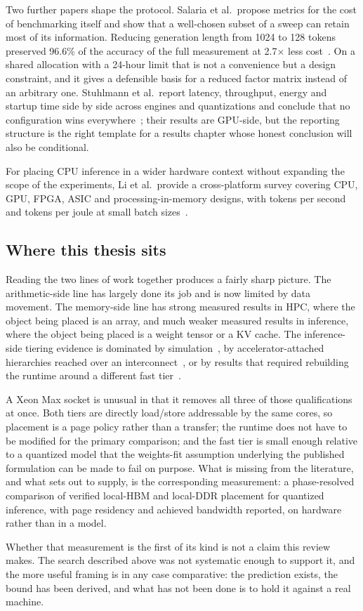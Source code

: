 Two further papers shape the protocol.  Salaria et al.\ propose metrics
for the cost of benchmarking itself and show that a well-chosen subset
of a sweep can retain most of its information.  Reducing generation
length from 1024 to 128 tokens preserved 96.6\% of the accuracy of the
full measurement at 2.7$\times$ less cost~\cite{salaria2025metametrics}.
On a shared allocation with a 24-hour limit that is not a convenience
but a design constraint, and it gives a defensible basis for a reduced
factor matrix instead of an arbitrary one.  Stuhlmann et al.\ report
latency, throughput, energy and startup time side by side across
engines and quantizations and conclude that no configuration wins
everywhere~\cite{stuhlmann2025bench360}; their results are GPU-side, but
the reporting structure is the right template for a results chapter
whose honest conclusion will also be conditional.

For placing CPU inference in a wider hardware context without expanding
the scope of the experiments, Li et al.\ provide a cross-platform survey
covering CPU, GPU, FPGA, ASIC and processing-in-memory designs, with
tokens per second and tokens per joule at small batch
sizes~\cite{li2024hardwareperspective}.

\subsection{Where this thesis sits}
\label{sec:lit-position}

Reading the two lines of work together produces a fairly sharp picture.
The arithmetic-side line has largely done its job and is now limited by
data movement.  The memory-side line has strong measured results in HPC,
where the object being placed is an array, and much weaker measured
results in inference, where the object being placed is a weight tensor
or a KV cache.  The inference-side tiering evidence is dominated by
simulation~\cite{fang2025kvplacement}, by accelerator-attached
hierarchies reached over an interconnect~\cite{jang2026itme,jang2026hymcache},
or by results that required rebuilding the runtime around a different
fast tier~\cite{zhang2026cacheresident}.

A Xeon Max socket is unusual in that it removes all three of those
qualifications at once.  Both tiers are directly load/store addressable
by the same cores, so placement is a page policy rather than a transfer;
the runtime does not have to be modified for the primary comparison; and
the fast tier is small enough relative to a quantized model that the
weights-fit assumption underlying the published formulation can be made
to fail on purpose.  What is missing from the literature, and what
 sets out to supply, is the corresponding
measurement: a phase-resolved comparison of verified local-HBM and
local-DDR placement for quantized \lcpp{} inference, with page residency
and achieved bandwidth reported, on hardware rather than in a model.

Whether that measurement is the first of its kind is not a claim this
review makes.  The search described above was not systematic enough to
support it, and the more useful framing is in any case comparative: the
prediction exists, the bound has been derived, and what has not been
done is to hold it against a real machine.

